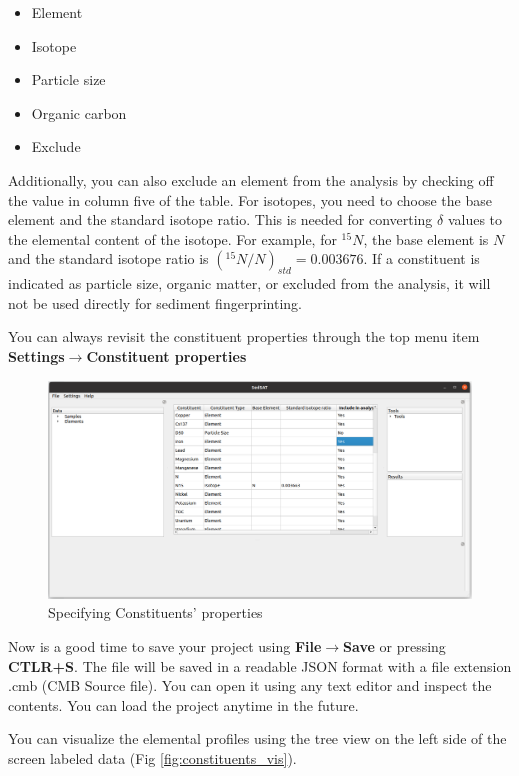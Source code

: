 \documentclass[12pt]{report}
\begin{document}
\begin{itemize}
    \item Element
    \item Isotope
    \item Particle size
    \item Organic carbon
    \item Exclude
\end{itemize}

Additionally, you can also exclude an element from the analysis by checking off the value in column five of the table. For isotopes, you need to choose the base element and the standard isotope ratio. This is needed for converting $\delta$ values to the elemental content of the isotope. For example, for $^{15}N$, the base element is $N$ and the standard isotope ratio is $(^{15}N/N)_{std}=0.003676$. If a constituent is indicated as particle size, organic matter, or excluded from the analysis, it will not be used directly for sediment fingerprinting.

You can always revisit the constituent properties through the top menu item \textbf{Settings}$\rightarrow$\textbf{Constituent properties} 

\begin{figure}[ht]
    \centering
    \includegraphics[width=14cm]{Figures/Element_Properties.png}
    \caption{Specifying Constituents' properties}
    \label{fig:element_properties}
\end{figure}

Now is a good time to save your project using \textbf{File}$\rightarrow$\textbf{Save} or pressing \textbf{CTLR+S}. The file will be saved in a readable JSON format with a file extension .cmb (CMB Source file). You can open it using any text editor and inspect the contents. You can load the project anytime in the future. 

You can visualize the elemental profiles using the tree view on the left side of the screen labeled data (Fig \ref{fig:constituents_vis}). 
\end{document}
